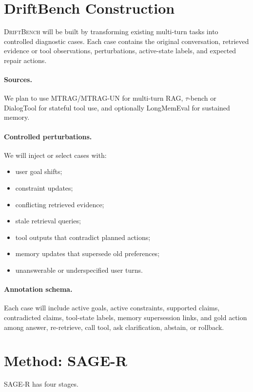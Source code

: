 \documentclass[letterpaper]{article}
\begin{document}
\section{DriftBench Construction}

\textsc{DriftBench} will be built by transforming existing multi-turn tasks into controlled diagnostic cases. Each case contains the original conversation, retrieved evidence or tool observations, perturbations, active-state labels, and expected repair actions.

\paragraph{Sources.}
We plan to use MTRAG/MTRAG-UN for multi-turn RAG, $\tau$-bench or DialogTool for stateful tool use, and optionally LongMemEval for sustained memory.

\paragraph{Controlled perturbations.}
We will inject or select cases with:
\begin{itemize}
    \item user goal shifts;
    \item constraint updates;
    \item conflicting retrieved evidence;
    \item stale retrieval queries;
    \item tool outputs that contradict planned actions;
    \item memory updates that supersede old preferences;
    \item unanswerable or underspecified user turns.
\end{itemize}

\paragraph{Annotation schema.}
Each case will include active goals, active constraints, supported claims, contradicted claims, tool-state labels, memory supersession links, and gold action among answer, re-retrieve, call tool, ask clarification, abstain, or rollback.

\section{Method: SAGE-R}

\textsc{SAGE-R} has four stages.
\end{document}
